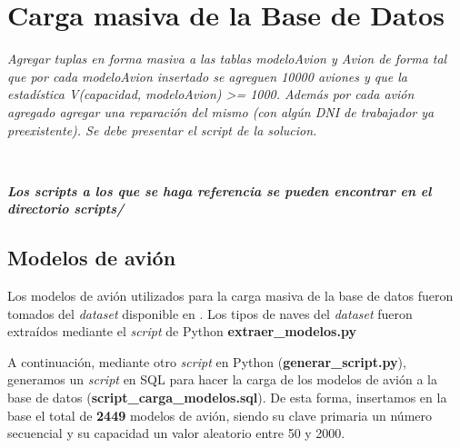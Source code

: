 







\clearpage
\tableofcontents
\clearpage


\section{Carga masiva de la Base de Datos}

\emph{Agregar tuplas en forma masiva a las tablas modeloAvion y Avion de forma tal que por cada modeloAvion insertado se agreguen 10000 aviones y que la estadística V(capacidad, modeloAvion) >= 1000. Además por cada avión agregado agregar una reparación del mismo (con algún DNI de trabajador ya preexistente). Se debe presentar el script de la solucion.} 

~

\emph{\textbf{Los scripts a los que se haga referencia se pueden encontrar en el directorio scripts/}} 

\subsection{Modelos de avión}

Los modelos de avión utilizados para la carga masiva de la base de datos fueron tomados del \emph{dataset} disponible en \cite{dataset}. Los tipos de naves del \emph{dataset} fueron extraídos mediante el \emph{script} de Python \textbf{extraer\_modelos.py}

A continuación, mediante otro \emph{script} en Python (\textbf{generar\_script.py}), generamos un \emph{script} en SQL para hacer la carga de los modelos de avión a la base de datos (\textbf{script\_carga\_modelos.sql}). De esta forma, insertamos en la base el total de \textbf{2449} modelos de avión, siendo su clave primaria un número secuencial y su capacidad un valor aleatorio entre 50 y 2000. 

